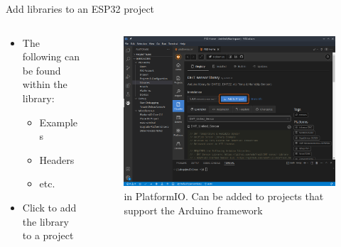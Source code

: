 \documentclass[aspectratio=169]{beamer}
\begin{document}
\begin{frame}{Add libraries to an ESP32 project}
\begin{columns}
	\begin{column}{0.5\textwidth}
		\begin{textBox}
			\begin{itemize}
				\item The following can be found within the library:
				\begin{itemize}
					\item Examples
					\item Headers
					\item etc.
				\end{itemize}
				\item Click  to add the library to a project
			\end{itemize}
		\end{textBox}
	\end{column}
	\begin{column}{0.5\textwidth}
		\begin{figure}
  			\includegraphics[width=\textwidth,keepaspectratio=true]{assets/pictures/pio-libraries-2.png}
  			\caption{ in PlatformIO. Can be added to projects that support the Arduino framework}
  			\label{fig:pio-libraries-2}
		\end{figure}
	\end{column}
\end{columns}
\end{frame}
\end{document}
